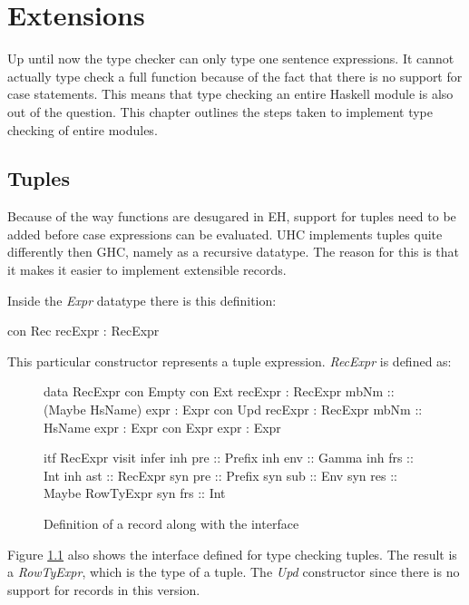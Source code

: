 \chapter{Extensions}
\label{cap:Extensions}
Up until now the type checker can only type one sentence expressions. It cannot actually type check a full function because of the fact that there is no support for case statements. This means that type checking an entire Haskell module is also out of the question. This chapter outlines the steps taken to implement type checking of entire modules.

\section{Tuples}
Because of the way functions are desugared in EH, support for tuples need to be added before case expressions can be evaluated. UHC implements tuples quite differently then GHC, namely as a recursive datatype. The reason for this is that it makes it easier to implement extensible records.

Inside the \emph{Expr} datatype there is this definition:
\begin{code}
  con Rec
    recExpr       :  RecExpr
\end{code}

This particular constructor represents a tuple expression. \emph{RecExpr} is defined as:

\begin{figure}[H]
\begin{minipage}[t]{0.5\linewidth}
\begin{code}
data RecExpr
  con Empty
  con Ext
    recExpr     :  RecExpr
    mbNm        :: (Maybe HsName)
    expr        :  Expr
  con Upd
    recExpr     :  RecExpr
    mbNm        :: HsName
    expr        :  Expr
  con Expr
    expr        :  Expr
\end{code}
\end{minipage}
\begin{minipage}[t]{0.5\linewidth}
\begin{code}
itf RecExpr
  visit infer
    inh pre  :: Prefix
    inh env  :: Gamma
    inh frs  :: Int
    inh ast  :: RecExpr
    syn pre  :: Prefix
    syn sub  :: Env
    syn res  :: Maybe RowTyExpr
    syn frs  :: Int 
\end{code}
\end{minipage}
\label{record}
\caption{Definition of a record along with the interface}
\end{figure}
Figure \ref{record} also shows the interface defined for type checking tuples. The result is a \emph{RowTyExpr}, which is the type of a tuple. The \emph{Upd} constructor since there is no support for records in this version.

